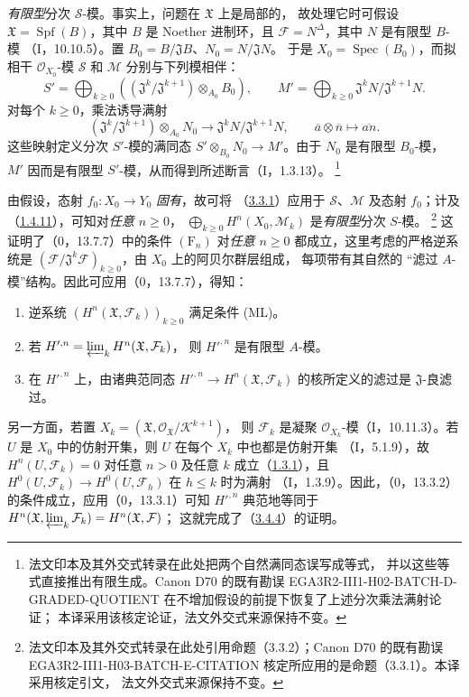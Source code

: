 \documentclass[UTF8,fontset=none,11pt,oneside,openany]{ctexbook}
\newcommand{\SourceCorrectionNote}[1]{\footnote{#1}}
\newcommand{\oldpage}[2][]{%
  \hypertarget{ega-source-page-#1-#2}{}%
  \marginnote{\scriptsize\textbf{#1}~|~#2}\ignorespaces}
\begin{document}
\oldpage[III]{121}
\emph{有限型}分次 $\mathcal S$-模。事实上，问题在 $\mathfrak X$ 上是局部的，
故处理它时可假设 $\mathfrak X=\operatorname{Spf}(B)$，其中 $B$ 是 Noether
进制环，且 $\mathcal F=N^\Delta$，其中 $N$ 是有限型 $B$-模
（I，10.10.5）。置 $B_0=B/\mathfrak J B$、$N_0=N/\mathfrak JN$。
于是 $X_0=\operatorname{Spec}(B_0)$，而拟相干 $\mathcal O_{X_0}$-模
$\mathcal S$ 和 $\mathcal M$ 分别与下列模相伴：
\[
S'=\bigoplus_{k\geq0}
((\mathfrak J^k/\mathfrak J^{k+1})\otimes_{A_0}B_0),\qquad
M'=\bigoplus_{k\geq0}\mathfrak J^kN/\mathfrak J^{k+1}N.
\]
对每个 $k\geq0$，乘法诱导满射
\[
(\mathfrak J^k/\mathfrak J^{k+1})\otimes_{A_0}N_0
\longrightarrow\mathfrak J^kN/\mathfrak J^{k+1}N,
\qquad \overline a\otimes\overline n\longmapsto\overline{an}.
\]
这些映射定义分次 $S'$-模的满同态
$S'\otimes_{B_0}N_0\longrightarrow M'$。由于 $N_0$ 是有限型 $B_0$-模，
$M'$ 因而是有限型 $S'$-模，从而得到所述断言（I，1.3.13）。
\SourceCorrectionNote{法文印本及其外交式转录在此处把两个自然满同态误写成等式，
并以这些等式直接推出有限生成。Canon D70 的既有勘误
EGA3R2-III1-H02-BATCH-D-GRADED-QUOTIENT 在不增加假设的前提下恢复了上述分次乘法满射论证；
本译采用该核定论证，法文外交式来源保持不变。}

由假设，态射 $f_0:X_0\to Y_0$ \emph{固有}，故可将
（\hyperref[III.3.3.1-fr]{3.3.1}）应用于 $\mathcal S$、$\mathcal M$ 及态射
$f_0$；计及（\hyperref[III.1.4.11-fr]{1.4.11}），可知对\emph{任意 $n\geq0$}，
$\bigoplus_{k\geq0}H^n(X_0,\mathcal M_k)$ 是\emph{有限型}分次 $S$-模。
\SourceCorrectionNote{法文印本及其外交式转录在此处引用命题（3.3.2）；Canon D70 的既有勘误
EGA3R2-III1-H03-BATCH-E-CITATION 核定所应用的是命题（3.3.1）。本译采用核定引文，
法文外交式来源保持不变。}
这证明了（0，13.7.7）中的条件 $(\mathrm F_n)$ 对\emph{任意 $n\geq0$}
都成立，这里考虑的严格逆系统是
$(\mathcal F/\mathfrak J^k\mathcal F)_{k\geq0}$，由 $X_0$ 上的阿贝尔群层组成，
每项带有其自然的
“滤过 $A$-模”结构。因此可应用（0，13.7.7），得知：
\begin{enumerate}
\item[$1^\circ$] 逆系统 $(H^n(\mathfrak X,\mathcal F_k))_{k\geq0}$
满足条件 (ML)。
\item[$2^\circ$] 若 $H'^{,n}=\varprojlim_kH^n(\mathfrak X,\mathcal F_k)$，
则 $H'^{,n}$ 是有限型 $A$-模。
\item[$3^\circ$] 在 $H'^{,n}$ 上，由诸典范同态
$H'^{,n}\to H^n(\mathfrak X,\mathcal F_k)$ 的核所定义的滤过是
$\mathfrak J$-良滤过。
\end{enumerate}

另一方面，若置 $X_k=(\mathfrak X,\mathcal O_{\mathfrak X}/\mathcal K^{k+1})$，
则 $\mathcal F_k$ 是凝聚 $\mathcal O_{X_k}$-模（I，10.11.3）。若 $U$
是 $X_0$ 中的仿射开集，则 $U$ 在每个 $X_k$ 中也都是仿射开集
（I，5.1.9），故 $H^n(U,\mathcal F_k)=0$ 对任意 $n>0$ 及任意 $k$
成立（\hyperref[III.1.3.1-fr]{1.3.1}），且
$H^0(U,\mathcal F_k)\to H^0(U,\mathcal F_h)$ 在 $h\leq k$ 时为满射
（I，1.3.9）。因此，（0，13.3.2）的条件成立，应用（0，13.3.1）可知
$H'^{,n}$ 典范地等同于
$H^n(\mathfrak X,\varprojlim_k\mathcal F_k)=H^n(\mathfrak X,\mathcal F)$；
这就完成了（\hyperref[III.3.4.4-fr]{3.4.4}）的证明。
\end{document}
